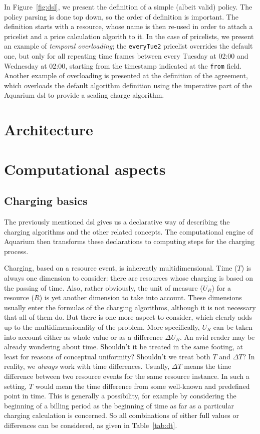 \documentclass[preprint,10pt]{sigplanconf}
\newcommand{\DTime}{\ensuremath{T}\xspace} %
\newcommand{\DeltaDTime}{\ensuremath{\Delta{T}}\xspace}
\newcommand{\DUnitR}{\ensuremath{U_{R}}\xspace} %
\newcommand{\DeltaDUnitR}{\ensuremath{\Delta U_{R}}\xspace}
\begin{document}
In Figure~\ref{fig:dsl}, we present the definition of a simple (albeit valid) 
policy. The policy parsing is done top down, so the order of definition 
is important. The definition starts with a resource, whose name is then
re-used in order to attach a pricelist and a price calculation algorith to it.
In the case of pricelists, we present an example of \emph{temporal overloading};
the \texttt{everyTue2} pricelist overrides the default one, but only for 
all repeating time frames between every Tuesday at 02:00 and Wednesday at
02:00, starting from the timestamp indicated at the \texttt{from} field. Another
example of overloading is presented at the definition of the agreement, which
overloads the default algorithm definition using the imperative part of the
Aquarium {\sc dsl} to provide a scaling charge algorithm.

\section{Architecture}


\section{Computational aspects}

\subsection{Charging basics}
The previously mentioned {\sc dsl} gives us a declarative way of describing the charging algorithms and the other related concepts. The computational engine of Aquarium then transforms these declarations to computing steps for the charging process.

Charging, based on a resource event, is inherently multidimensional. Time (\DTime) is always one dimension to consider: there are resources whose charging is based on the passing of time. Also, rather obviously, the unit of measure (\DUnitR) for a resource ($R$) is yet another dimension to take into account. These dimensions usually enter the formulas of the charging algorithms, although it is not necessary that all of them do. But there is one more aspect to consider, which clearly adds up to the multidimensionality of the problem. More specifically, \DUnitR can be taken into account either as whole value or as a difference \DeltaDUnitR. An avid reader may be already wondering about time. Shouldn't it be treated in the same footing, at least for reasons of conceptual uniformity? Shouldn't we treat both \DTime and \DeltaDTime? In reality, we \textit{always} work with time differences. Usually, \DeltaDTime means the time difference between two resource events for the same resource instance. In such a setting, \DTime would mean the time difference from some well-known and predefined point in time. This is generally a possibility, for example by considering the beginning of a billing period as the beginning of time as far as a particular charging calculation is concerned. So all combinations of either full values or differences can be considered, as given in Table~\ref{tab:dt}.
\end{document}
